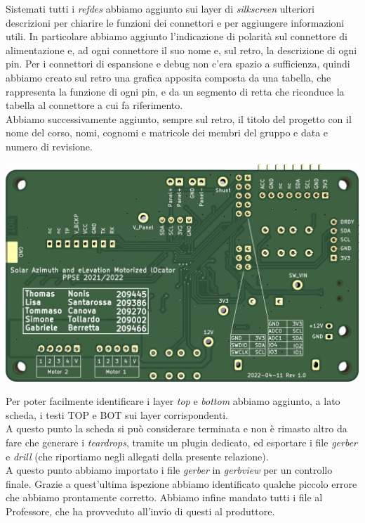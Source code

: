 \noindent Sistemati tutti i \textit{refdes} abbiamo aggiunto sui layer di \textit{silkscreen}
ulteriori descrizioni per chiarire le funzioni dei connettori e per
aggiungere informazioni utili. In particolare abbiamo aggiunto 
l’indicazione di polarità sul connettore di alimentazione e, ad ogni
connettore il suo nome e, sul retro, la descrizione di ogni pin. Per i
connettori di espansione e debug non c'era spazio a sufficienza, quindi
abbiamo creato sul retro una grafica apposita composta da una tabella,
che rappresenta la funzione di ogni pin, e da un segmento di retta che
riconduce la tabella al connettore a cui fa riferimento.\\
Abbiamo successivamente aggiunto, sempre sul retro, il titolo del
progetto con il nome del corso, nomi, cognomi e matricole dei membri del
gruppo e data e numero di revisione.

\begin{center}
\includegraphics[scale=0.2]{figures/image42.png}
\captionsetup{type=figure}
\end{center}

\noindent Per poter facilmente identificare i layer \textit{top} e \textit{bottom} abbiamo aggiunto,
a lato scheda, i testi TOP e BOT sui layer corrispondenti.\\
A questo punto la scheda si può considerare terminata e non è rimasto
altro da fare che generare i \textit{teardrops}, tramite un plugin dedicato, ed
esportare i file \textit{gerber} e \textit{drill} (che riportiamo negli allegati della
presente relazione).\\
A questo punto abbiamo importato i file \textit{gerber} in \emph{gerbview} per un
controllo finale. Grazie a quest'ultima ispezione abbiamo identificato
qualche piccolo errore che abbiamo prontamente corretto. Abbiamo infine
mandato tutti i file al Professore, che ha provveduto all'invio di
questi al produttore.
